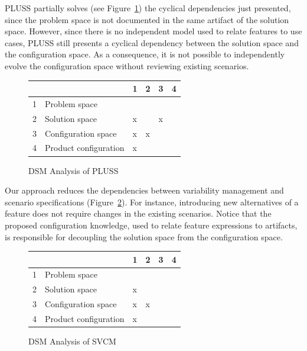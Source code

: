 \documentclass{acm_proc_article-sp}
\begin{document}
PLUSS partially solves (see Figure~\ref{dsm:pluss}) the cyclical dependencies just presented, since the problem space is not documented in the same artifact of the solution space. However, since there is no independent model used to relate features to use cases, PLUSS still presents a cyclical dependency between the solution space and the configuration space. As a consequence, it is not possible to independently evolve the configuration space without reviewing existing scenarios.

\begin{figure}[htb]
\centering
\begin{small}
\begin{tabular}{llllll} \hline
  &                         & 1 & 2 & 3 & 4 \\ \hline
1 & Problem space           &   &   &   &   \\
2 & Solution space          & x &   & x &   \\
3 & Configuration space     & x & x &   &   \\
4 & Product configuration   & x &  &   &    \\ \hline
\end{tabular}
\end{small}
\caption{DSM Analysis of PLUSS}
\label{dsm:pluss}
\end{figure}

Our approach reduces the dependencies between variability management and scenario specifications
(Figure~\ref{dsm:cc}). For instance, introducing new alternatives of a feature does not require changes in the existing scenarios. Notice that the proposed configuration knowledge, used to relate feature expressions to artifacts, is responsible for
decoupling the solution space from the configuration space.

\begin{figure}[h]
\centering
\begin{small}
\begin{tabular}{llllll} \hline
  &                         & 1 & 2 & 3 & 4 \\ \hline
1 & Problem space           &   &   &   &   \\
2 & Solution space          & x &   &   &   \\
3 & Configuration space     & x & x &   &   \\
4 & Product configuration   & x &  &    &    \\ \hline
\end{tabular}
\end{small}
\caption{DSM Analysis of SVCM}
\label{dsm:cc}
\end{figure}
\end{document}
